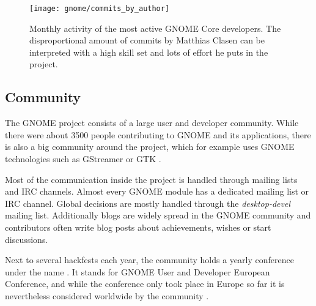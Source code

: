 \begin{figure}[htbp]
  \centering
  \texttt{[image: gnome/commits\_by\_author]}
  \caption[Commits by Most Active Authors, GNOME]
  {Monthly activity of the most active GNOME Core developers. The
    disproportional amount of commits by Matthias Clasen can be interpreted
    with a high skill set and lots of effort he puts in the project.}
  \label{fig:gnome:cba}
\end{figure}


\subsection{Community} %

The GNOME project consists of a large user and developer community. While there
were about 3500 people contributing to GNOME and its applications, there is
also a big community around the project, which for example uses GNOME
technologies such as GStreamer or \ac{GTK} \cite{GNOMEAbout,GNOMETeams}.

Most of the communication inside the project is handled through mailing lists
and \ac{IRC} channels. Almost every GNOME module has a dedicated mailing list
or \ac{IRC} channel. Global decisions are mostly handled through the
\emph{desktop-devel} mailing list. Additionally blogs are widely spread in the
GNOME community and contributors often write blog posts about achievements,
wishes or start discussions.

Next to several hackfests each year, the community holds a yearly conference
under the name . It stands for GNOME User and Developer
European Conference, and while the conference only took place in Europe so far
it is nevertheless considered worldwide by the community \cite{GNOMEGUADEC}.

